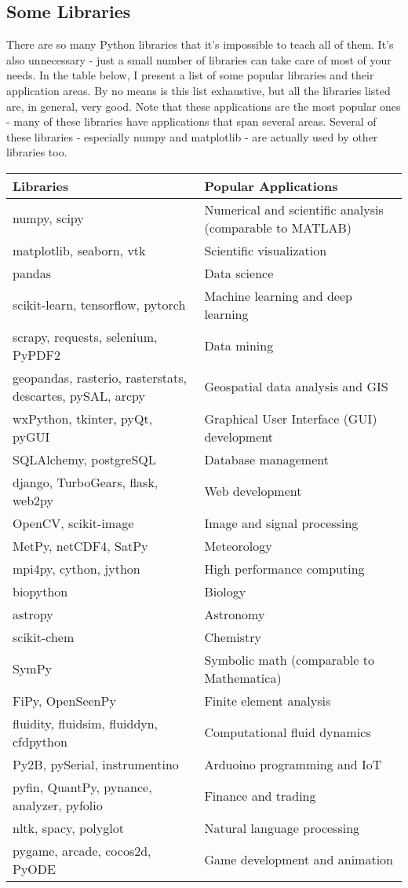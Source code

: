 \documentclass[12pt]{article}
\begin{document}
\subsection{Some Libraries}
There are so many Python libraries that it's impossible to teach all of them. It's also unnecessary - just a small number of libraries can take care of most of your needs. In the table below, I present a list of some popular libraries and their application areas. By no means is this list exhaustive, but all the libraries listed are, in general, very good. Note that these applications are the most popular ones - many of these libraries have applications that span several areas. Several of these libraries - especially numpy and matplotlib - are actually used by other libraries too.

\begin{tabular}{|p{2in}|p{3in}|}
\hline
\textbf{Libraries} & \textbf{Popular Applications} \\ \hline
numpy, scipy & Numerical and scientific analysis (comparable to MATLAB) \\ \hline
matplotlib, seaborn, vtk & Scientific visualization \\ \hline
pandas & Data science \\ \hline
scikit-learn, tensorflow, pytorch & Machine learning and deep learning \\ \hline
scrapy, requests, selenium, PyPDF2 & Data mining \\ \hline
geopandas, rasterio, rasterstats, descartes, pySAL, arcpy & Geospatial data analysis and GIS \\ \hline
wxPython, tkinter, pyQt, pyGUI & Graphical User Interface (GUI) development \\ \hline
SQLAlchemy, postgreSQL & Database management \\ \hline
django, TurboGears, flask, web2py & Web development \\ \hline
OpenCV, scikit-image & Image and signal processing \\ \hline
MetPy, netCDF4, SatPy & Meteorology \\ \hline
mpi4py, cython, jython & High performance computing \\ \hline
biopython & Biology \\ \hline
astropy & Astronomy \\ \hline
scikit-chem & Chemistry \\ \hline
SymPy & Symbolic math (comparable to Mathematica) \\ \hline
FiPy, OpenSeenPy & Finite element analysis \\ \hline
fluidity, fluidsim, fluiddyn, cfdpython & Computational fluid dynamics \\ \hline
Py2B, pySerial, instrumentino & Arduoino programming and IoT \\ \hline
pyfin, QuantPy, pynance, analyzer, pyfolio & Finance and trading \\ \hline
nltk, spacy, polyglot & Natural language processing \\ \hline
pygame, arcade, cocos2d, PyODE & Game development and animation \\ \hline
\end{tabular}
\end{document}
